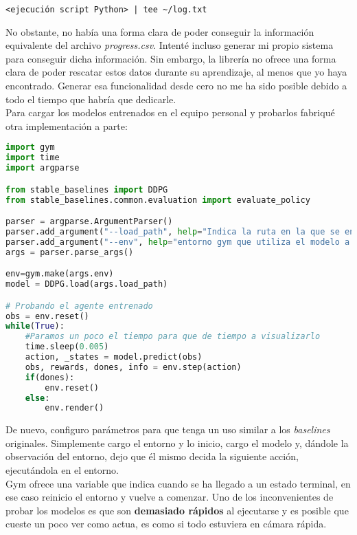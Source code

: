 \documentclass[11pt,fleqn]{book} %
\begin{document}
\begin{verbatim}
<ejecución script Python> | tee ~/log.txt
\end{verbatim} 

No obstante, no había una forma clara de poder conseguir la información equivalente del archivo \textit{progress.csv}. Intenté incluso generar mi propio sistema para conseguir dicha información. Sin embargo, la librería no ofrece una forma clara de poder rescatar estos datos durante su aprendizaje, al menos que yo haya encontrado. Generar esa funcionalidad desde cero no me ha sido posible debido a todo el tiempo que habría que dedicarle. \\

Para cargar los modelos entrenados en el equipo personal y probarlos fabriqué otra implementación a parte: \\

\begin{lstlisting}[language=python]
import gym
import time
import argparse

from stable_baselines import DDPG
from stable_baselines.common.evaluation import evaluate_policy

parser = argparse.ArgumentParser()
parser.add_argument("--load_path", help="Indica la ruta en la que se encuentra el modelo a cargar")
parser.add_argument("--env", help="entorno gym que utiliza el modelo a cargar")
args = parser.parse_args()

env=gym.make(args.env)
model = DDPG.load(args.load_path)

# Probando el agente entrenado
obs = env.reset()
while(True):
	#Paramos un poco el tiempo para que de tiempo a visualizarlo
	time.sleep(0.005)
	action, _states = model.predict(obs)
	obs, rewards, dones, info = env.step(action)
	if(dones):
		env.reset()
	else:
		env.render()
\end{lstlisting}

De nuevo, configuro parámetros para que tenga un uso similar a los \textit{baselines} originales. Simplemente cargo el entorno y lo inicio, cargo el modelo y, dándole la observación del entorno, dejo que él mismo decida la siguiente acción, ejecutándola en el entorno. \\

Gym ofrece una variable que indica cuando se ha llegado a un estado terminal, en ese caso reinicio el entorno y vuelve a comenzar. Uno de los inconvenientes de probar los modelos es que son \textbf{demasiado rápidos} al ejecutarse y es posible que cueste un poco ver como actua, es como si todo estuviera en cámara rápida. \\
\end{document}
